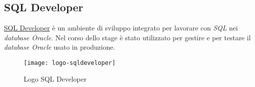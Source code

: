 \subsection{SQL Developer}
\href{https://www.oracle.com/database/technologies/appdev/sqldeveloper-landing.html}{SQL Developer} è un ambiente di sviluppo integrato per lavorare con \textit{SQL} nei \textit{database Oracle}. Nel corso dello stage è stato utilizzato per gestire e per testare il \textit{database Oracle} usato in produzione.
\begin{figure}[h]
    \begin{center}
    \texttt{[image: logo-sqldeveloper]}
    \caption{Logo SQL Developer}
    \label{fig:figure13}
    \end{center}
\end{figure}